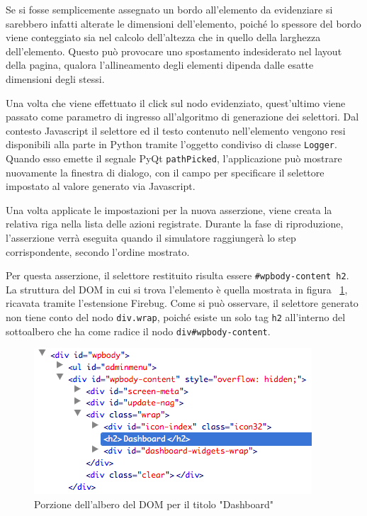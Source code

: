 Se si fosse semplicemente assegnato un bordo all'elemento da evidenziare si sarebbero infatti alterate le dimensioni dell'elemento, poiché lo spessore del bordo viene conteggiato sia nel calcolo dell'altezza che in quello della larghezza dell'elemento. Questo può provocare uno spostamento indesiderato nel layout della pagina, qualora l'allineamento degli elementi dipenda dalle esatte dimensioni degli stessi.

Una volta che viene effettuato il click sul nodo evidenziato, quest'ultimo viene passato come parametro di ingresso all'algoritmo di generazione dei selettori. Dal contesto Javascript il selettore ed il testo contenuto nell'elemento vengono resi disponibili alla parte in Python tramite l'oggetto condiviso di classe \verb|Logger|. Quando esso emette il segnale PyQt \verb|pathPicked|, l'applicazione può mostrare nuovamente la finestra di dialogo, con il campo per specificare il selettore impostato al valore generato via Javascript.

Una volta applicate le impostazioni per la nuova asserzione, viene creata la relativa riga nella lista delle azioni registrate. Durante la fase di riproduzione, l'asserzione verrà eseguita quando il simulatore raggiungerà lo step corrispondente, secondo l'ordine mostrato.

Per questa asserzione, il selettore restituito risulta essere \verb|#wpbody-content h2|. La struttura del DOM in cui si trova l'elemento è quella mostrata in figura ~\ref{fig:dashboardH2DOM}, ricavata tramite l'estensione Firebug. Come si può osservare, il selettore generato non tiene conto del nodo \verb|div.wrap|, poiché esiste un solo tag \verb|h2| all'interno del sottoalbero che ha come radice il nodo \verb|div#wpbody-content|. 

\begin{figure}[htbp]
\begin{center}
\includegraphics[width=\textwidth]{images/wp_tour/7_dashboard_h2_firebug.png}
\caption{Porzione dell'albero del DOM per il titolo "Dashboard"}
\label{fig:dashboardH2DOM}
\end{center}
\end{figure}

